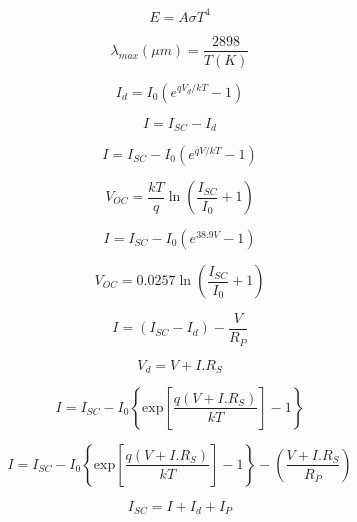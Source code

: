 \documentclass[12pt]{article}
\begin{document}
\begin{equation}
\label{stefbolt}
E = A \sigma T^{4}
\end{equation}

\begin{equation}
\label{wien}
\lambda_{{max}}(\mu m)=\frac{2898}{T(K)}
\end{equation}

\begin{equation}
\label{diode}
I_{d} = I_{0}( e^{qV_{d}/kT}-1)
\end{equation}

\begin{equation}
\label{pv1}
I = I_{SC}-I_{d}
\end{equation}

\begin{equation}
\label{pv2}
I = I_{SC}-I_{0} \left(e^{qV/kT}-1 \right )
\end{equation}

\begin{equation}
\label{pv3}
V_{OC} = \frac{kT}{q}\ln \left (\frac{I_{SC}}{I_{0}}+1\right )
\end{equation}


\begin{equation}
\label{pv4}
I = I_{SC}-I_{0} \left(e^{38.9V}-1 \right )
\end{equation}

\begin{equation}
\label{pv5}
V_{OC} = 0.0257\ln \left (\frac{I_{SC}}{I_{0}}+1\right )
\end{equation}


\begin{equation}
\label{pv6}
I = (I_{SC}-I_{d})-\frac{V}{R_{P}}
\end{equation}

\begin{equation}
\label{pv7}
V_{d}=V+I.R_{S}
\end{equation}

\begin{equation}
\label{pv8}
I = I_{SC}-I_{0} \left\{\text{exp}\left[\frac{q(V+I.R_{S})}{kT} \right]-1 \right\}
\end{equation}

\begin{equation}
\label{pv9}
I = I_{SC}-I_{0} \left\{\text{exp}\left[\frac{q(V+I.R_{S})}{kT} \right]-1 \right\}-\left(\frac{V+I.R_{S}}{R_{P}}\right)
\end{equation}

\begin{equation}
\label{pv10}
I_{SC}=I+I_{d}+I_{P}
\end{equation}
\end{document}
